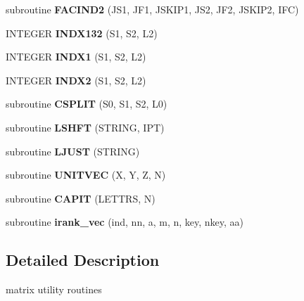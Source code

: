 \begin{CompactItemize}
\item 
\hypertarget{mat1_8F_81a838897b223caf6ce31b16cecabac5}{
subroutine \textbf{FACIND2} (JS1, JF1, JSKIP1, JS2, JF2, JSKIP2, IFC)}
\label{mat1_8F_81a838897b223caf6ce31b16cecabac5}

\item 
\hypertarget{mat1_8F_b35f1f76121af12fabc20434943e3929}{
INTEGER \textbf{INDX132} (S1, S2, L2)}
\label{mat1_8F_b35f1f76121af12fabc20434943e3929}

\item 
\hypertarget{mat1_8F_f729c1fe65ed4a317fe3960b524bae5d}{
INTEGER \textbf{INDX1} (S1, S2, L2)}
\label{mat1_8F_f729c1fe65ed4a317fe3960b524bae5d}

\item 
\hypertarget{mat1_8F_6bc538abe33adbe4c74046ae58752110}{
INTEGER \textbf{INDX2} (S1, S2, L2)}
\label{mat1_8F_6bc538abe33adbe4c74046ae58752110}

\item 
\hypertarget{mat1_8F_3ae003790f2e68b9713ec7c99aed1c7c}{
subroutine \textbf{CSPLIT} (S0, S1, S2, L0)}
\label{mat1_8F_3ae003790f2e68b9713ec7c99aed1c7c}

\item 
\hypertarget{mat1_8F_801af687cd9d6d40674f56d54ad1080b}{
subroutine \textbf{LSHFT} (STRING, IPT)}
\label{mat1_8F_801af687cd9d6d40674f56d54ad1080b}

\item 
\hypertarget{mat1_8F_183a357ccb77858e783228f6f5e61834}{
subroutine \textbf{LJUST} (STRING)}
\label{mat1_8F_183a357ccb77858e783228f6f5e61834}

\item 
\hypertarget{mat1_8F_d0f769fa9645aba55a5327d545890449}{
subroutine \textbf{UNITVEC} (X, Y, Z, N)}
\label{mat1_8F_d0f769fa9645aba55a5327d545890449}

\item 
\hypertarget{mat1_8F_0081d33d96385617301c7751b121cbca}{
subroutine \textbf{CAPIT} (LETTRS, N)}
\label{mat1_8F_0081d33d96385617301c7751b121cbca}

\item 
\hypertarget{mat1_8F_e736fabe1f3b79f4f460d680b5864979}{
subroutine \textbf{irank\_\-vec} (ind, nn, a, m, n, key, nkey, aa)}
\label{mat1_8F_e736fabe1f3b79f4f460d680b5864979}

\end{CompactItemize}


\subsection{Detailed Description}
matrix utility routines 

